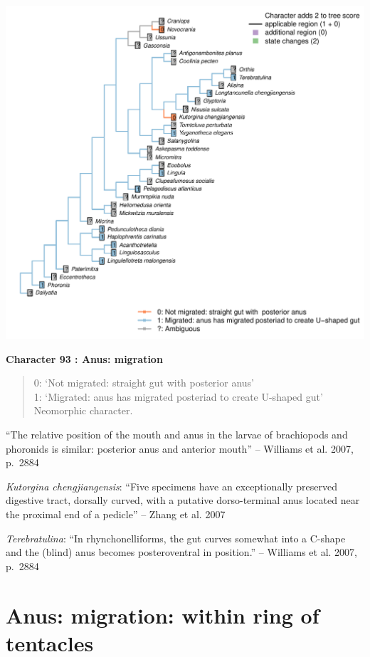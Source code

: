 \documentclass[]{book}
\theoremstyle{definition}
\theoremstyle{definition}
\theoremstyle{definition}
\theoremstyle{remark}
\begin{document}
\includegraphics{Brachiopod_phylogeny_files/figure-latex/unnamed-chunk-5-93.pdf}

\textbf{Character 93 : Anus: migration }

\begin{quote}
0: `Not migrated: straight gut with posterior anus'\\
1: `Migrated: anus has migrated posteriad to create U-shaped gut'\\
Neomorphic character.
\end{quote}

``The relative position of the mouth and anus in the larvae of
brachiopods and phoronids is similar: posterior anus and anterior
mouth'' -- Williams et al. 2007, p.~2884

\emph{Kutorgina chengjiangensis}: ``Five specimens have an exceptionally
preserved digestive tract, dorsally curved, with a putative
dorso-terminal anus located near the proximal end of a pedicle'' --
Zhang et al. 2007

\emph{Terebratulina}: ``In rhynchonelliforms, the gut curves somewhat
into a C-shape and the (blind) anus becomes posteroventral in
position.'' -- Williams et al. 2007,\\
p.~2884

\hypertarget{anus-migration-within-ring-of-tentacles}{%
\section*{Anus: migration: within ring of
tentacles}\label{anus-migration-within-ring-of-tentacles}}
\end{document}
